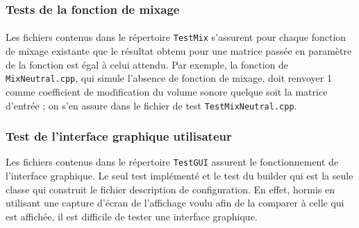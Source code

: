 \subsubsection{Tests de la fonction de mixage}
\paragraph{}
Les fichiers contenus dans le répertoire \verb!TestMix! s'assurent
pour chaque fonction de mixage existante que le résultat obtenu pour
une matrice passée en paramètre de la fonction est égal à celui
attendu. Par exemple, la fonction de \verb!MixNeutral.cpp!, qui simule
l'absence de fonction de mixage, doit renvoyer 1 comme coefficient de
modification du volume sonore quelque soit la matrice d'entrée ; on
s'en assure dans le fichier de test \verb!TestMixNeutral.cpp!.

\subsubsection{Test de l'interface graphique utilisateur}
Les fichiers contenus dans le répertoire \verb!TestGUI! assurent
le fonctionnement de l'interface graphique. Le seul test implémenté
et le test du builder qui est la seule classe qui construit le fichier description
de configuration.
En effet, hormis en utilisant une capture d'écran de l'affichage voulu afin
de la comparer à celle qui est affichée, il est difficile de tester
une interface graphique.
